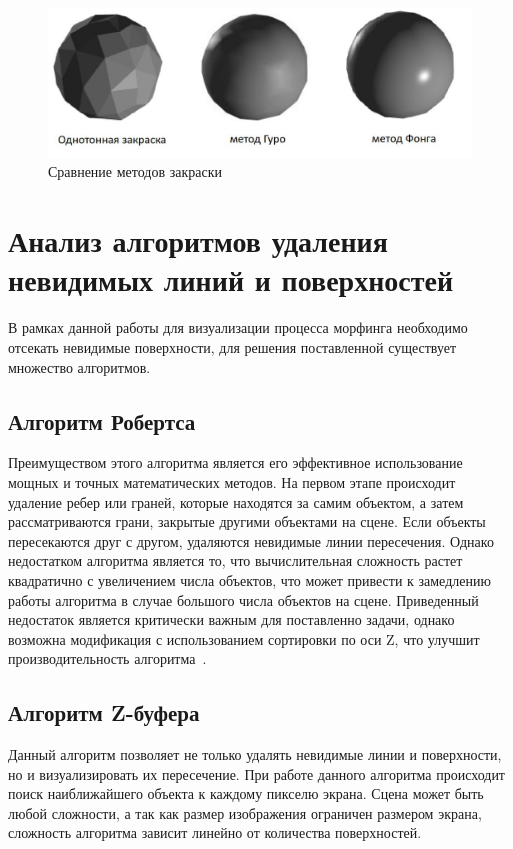 \begin{figure}[H]
	\centering
	\includegraphics[scale=0.6]{images/shading_compare.jpg}
	\caption{Сравнение методов закраски}
	\label{fig:shading_compare}
\end{figure}


\section{Анализ алгоритмов удаления невидимых линий и поверхностей}

В рамках данной работы для визуализации процесса морфинга необходимо отсекать невидимые поверхности, для решения поставленной
существует множество алгоритмов.

\subsection{Алгоритм Робертса}
Преимуществом этого алгоритма является его эффективное использование мощных и точных математических методов. 
На первом этапе происходит удаление ребер или граней, которые находятся за самим объектом, а затем рассматриваются грани, закрытые другими объектами на сцене. 
Если объекты пересекаются друг с другом, удаляются невидимые линии пересечения. 
Однако недостатком алгоритма является то, что вычислительная сложность растет квадратично с увеличением числа объектов,
что может привести к замедлению работы алгоритма в случае большого числа объектов на сцене.
Приведенный недостаток является критически важным для поставленно задачи, однако возможна модификация с использованием 
сортировки по оси Z, что улучшит производительность алгоритма~\cite{Rodgers}.

\subsection{Алгоритм Z-буфера}
Данный алгоритм позволяет не только удалять невидимые линии и поверхности, но и визуализировать их пересечение.
При работе данного алгоритма происходит поиск наиближайшего объекта к каждому пикселю экрана.
Сцена может быть любой сложности, а так как размер изображения ограничен размером экрана, сложность алгоритма зависит линейно от количества поверхностей. 

